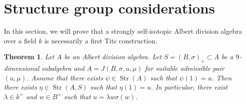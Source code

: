 \documentclass{amsart}
\newtheorem{thm}[equation]{Theorem}
\theoremstyle{definition} %
\theoremstyle{remark} %
\DeclareMathOperator{\Str}{Str}
\renewcommand{\:}{\colon\,}
\numberwithin{equation}{section}
\begin{document}
\iffalse
\section{Structure group considerations} In this section, we will prove that a strongly self-isotopic Albert division algebra over a field $k$ is necessarily a first Tits construction. 
\begin{thm}\label{key} Let $A$ be an Albert division algebra. Let $S=(B,\sigma)_+\subset A$ be a $9$-dimensional subalgebra and $A=J(B,\sigma, u, \mu)$ for suitable admissible pair $(u,\mu)$. Assume that there exists $\psi\in\Str(A)$ such that $\psi(1)=u$. Then there exists 
	$\eta\in\Str(A,S)$ such that $\eta(1)=u$. In particular, there exist $\lambda\in k^{\times}$ and $w\in B^{\times}$ such that $u=\lambda w\sigma(w)$.
\end{thm}
\end{document}
